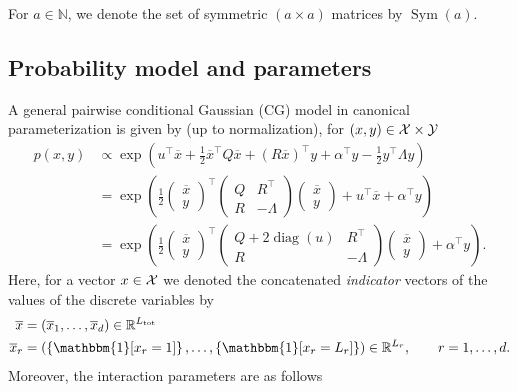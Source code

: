 \documentclass{article}
\def\tot{\text{tot}}
\newcommand{\indFunc}[1]{\mathbbm{1}[ #1 ]}
\newcommand{\IR}{{\mathbb{R}}}\newcommand{\IN}{{\mathbb{N}}}
\newcommand{\bPc}[1]{\ensuremath{\left\{#1 \right\}}} %
\newcommand{\bPr}[1]{\ensuremath{\left(#1 \right)}} %
\DeclareMathOperator{\diag}{diag}
\DeclareMathOperator{\Sym}{Sym}
\begin{document}
For $a\in\IN$, we denote the set of symmetric $(a\times a)$ matrices by $\Sym(a)$.

\subsection{Probability model and parameters}
A general pairwise conditional Gaussian (CG) model in canonical parameterization is given by (up to normalization), for $(x, y)\in\mathcal{X} \times\mathcal{Y}$
\begin{align*}
p(x,y)&\propto\exp\bPr{u^\top \overline{x} + \frac{1}{2}\overline{x}^\top Q \overline{x} + (R\overline{x})^\top y +\alpha^\top y  -\frac{1}{2}y^\top\Lambda y} \\
&=  \exp\bPr{\frac{1}{2}\begin{pmatrix}\overline{x} \\ y\end{pmatrix}^\top \begin{pmatrix} Q & R^\top \\ R & - \Lambda\end{pmatrix} \begin{pmatrix}\overline{x} \\ y\end{pmatrix} + u^\top \overline{x} +\alpha^\top y} 
\\&=  \exp\bPr{\frac{1}{2}\begin{pmatrix}\overline{x} \\ y\end{pmatrix}^\top \begin{pmatrix} Q + 2\diag(u)& R^\top \\ R & - \Lambda\end{pmatrix} \begin{pmatrix}\overline{x} \\ y\end{pmatrix} +\alpha^\top y}.
\end{align*}
Here, for a vector $x\in\mathcal{X}$ we denoted the concatenated \emph{indicator} vectors of the values of the discrete variables by
\begin{align*}
\overline{x}&=\bPr{\overline{x}_1,\ldots, \overline{x}_d }\in\IR^{L_{\tot}}\\
\overline{x}_r &= \bPr{\bPc{\indFunc{x_r=1}}, \ldots, \bPc{\indFunc{x_{r}=L_r}} }\in\IR^{L_r},\qquad r=1,\ldots, d.
\end{align*}
Moreover, the interaction parameters are as follows
\end{document}
